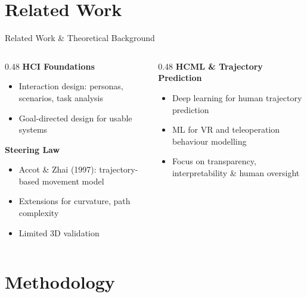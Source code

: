 \documentclass[aspectratio=169, 10pt]{beamer}
\begin{document}
\section{Related Work}

\begin{frame}{Related Work \& Theoretical Background}
  \begin{columns}[T]
    \begin{column}{0.48\textwidth}
      \textbf{HCI Foundations}
      \begin{itemize}
        \item Interaction design: personas, scenarios, task analysis
        \item Goal-directed design for usable systems
      \end{itemize}

      \vspace{0.6em}
      \textbf{Steering Law}
      \begin{itemize}
        \item Accot \& Zhai (1997): trajectory-based movement model
        \item Extensions for curvature, path complexity
        \item Limited 3D validation
      \end{itemize}
    \end{column}
    \begin{column}{0.48\textwidth}
      \textbf{HCML \& Trajectory Prediction}
      \begin{itemize}
        \item Deep learning for human trajectory prediction
        \item ML for VR and teleoperation behaviour modelling
        \item Focus on transparency, interpretability \& human oversight
      \end{itemize}
    \end{column}
  \end{columns}
\end{frame}

\section{Methodology}
\end{document}
